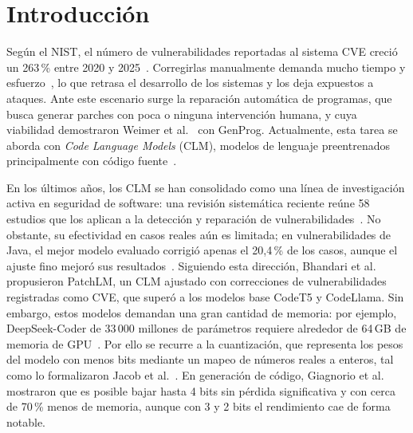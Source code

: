 \documentclass[conference]{IEEEtran}
\begin{document}
\section{Introducción}

Según el NIST, el número de vulnerabilidades reportadas al sistema CVE creció un 263\,\% entre 2020 y 2025~\cite{nist2026nvd}. Corregirlas manualmente demanda mucho tiempo y esfuerzo~\cite{zhang2023pretrained}, lo que retrasa el desarrollo de los sistemas y los deja expuestos a ataques. Ante este escenario surge la reparación automática de programas, que busca generar parches con poca o ninguna intervención humana, y cuya viabilidad demostraron Weimer et al.~\cite{weimer2009genprog} con GenProg. Actualmente, esta tarea se aborda con \emph{Code Language Models} (CLM), modelos de lenguaje preentrenados principalmente con código fuente~\cite{jiang2023impact}.

En los últimos años, los CLM se han consolidado como una línea de investigación activa en seguridad de software: una revisión sistemática reciente reúne 58 estudios que los aplican a la detección y reparación de vulnerabilidades~\cite{zhou2025llmvuln}. No obstante, su efectividad en casos reales aún es limitada; en vulnerabilidades de Java, el mejor modelo evaluado corrigió apenas el 20,4\,\% de los casos, aunque el ajuste fino mejoró sus resultados~\cite{wu2023effective}. Siguiendo esta dirección, Bhandari et al.~\cite{bhandari2025patchlm} propusieron PatchLM, un CLM ajustado con correcciones de vulnerabilidades registradas como CVE, que superó a los modelos base CodeT5 y CodeLlama. Sin embargo, estos modelos demandan una gran cantidad de memoria: por ejemplo, DeepSeek-Coder de 33\,000 millones de parámetros requiere alrededor de 64\,GB de memoria de GPU~\cite{giagnorio2025quantizing}. Por ello se recurre a la cuantización, que representa los pesos del modelo con menos bits mediante un mapeo de números reales a enteros, tal como lo formalizaron Jacob et al.~\cite{jacob2018quantization}. En generación de código, Giagnorio et al.~\cite{giagnorio2025quantizing} mostraron que es posible bajar hasta 4 bits sin pérdida significativa y con cerca de 70\,\% menos de memoria, aunque con 3 y 2 bits el rendimiento cae de forma notable.
\end{document}
